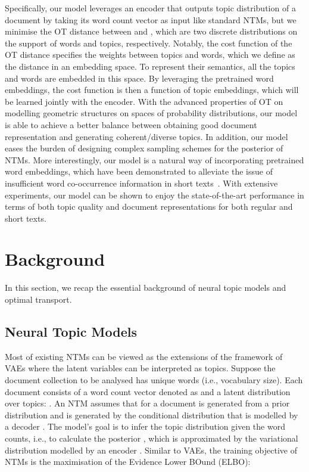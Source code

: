 \documentclass{article}
\begin{document}
Specifically, our model leverages an encoder that outputs topic distribution  of a document by taking its word count vector as input like standard NTMs, but we minimise the OT distance between  and , which are two discrete distributions on the support of words and topics, respectively. Notably, the cost function of the OT distance specifies the weights between topics and words, which we define as the distance in an embedding space. To represent their semantics, all the topics and words are embedded in this space. By leveraging the pretrained word embeddings, the cost function is then a function of topic embeddings, which will be learned jointly with the encoder. With the advanced properties of OT on modelling geometric structures on spaces of probability distributions, our model is able to achieve a better balance between obtaining good document representation and generating coherent/diverse topics. In addition, our model eases the burden of designing complex sampling schemes for the posterior of NTMs. More interestingly, our model is a natural way of incorporating pretrained word embeddings, which have been demonstrated to alleviate the issue of insufficient word co-occurrence information in short texts~\citep{zhao2017word,dieng2019topic}. With extensive experiments, our model can be shown to enjoy the state-of-the-art performance in terms of both topic quality and document representations for both regular and short texts.





\section{Background}
In this section, we recap the essential background of neural topic models and optimal transport.
\subsection{Neural Topic Models}
\label{sec-ntm}
Most of existing NTMs can be viewed as the extensions of the framework of VAEs where the latent variables can be interpreted as topics.
Suppose the document collection to be analysed has  unique words (i.e., vocabulary size).
Each document consists of a word count vector denoted as  and a latent distribution over  topics: .
An NTM assumes that  for a document is generated from a prior distribution  and  is generated by the conditional distribution  that is modelled by a decoder .
The model's goal is to infer the topic distribution given the word counts, i.e., to calculate the posterior , which is approximated by the variational distribution  modelled by an encoder . Similar to VAEs, the training objective of NTMs is the maximisation of the Evidence Lower BOund (ELBO):
\end{document}
